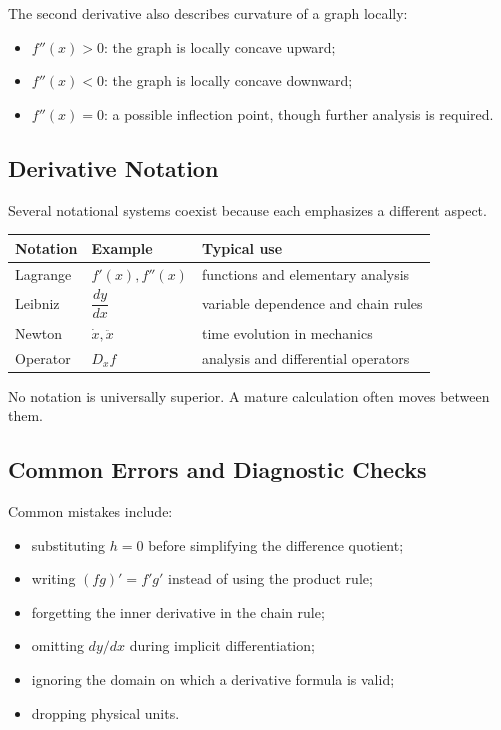The second derivative also describes curvature of a graph locally:

\begin{itemize}
\item $f''(x)>0$: the graph is locally concave upward;
\item $f''(x)<0$: the graph is locally concave downward;
\item $f''(x)=0$: a possible inflection point, though further analysis is required.
\end{itemize}

\subsection{Derivative Notation}

Several notational systems coexist because each emphasizes a different aspect.

\begin{center}
\begin{tabular}{lll}
\toprule
Notation & Example & Typical use\\
\midrule
Lagrange & $f'(x), f''(x)$ & functions and elementary analysis\\
Leibniz & $\dfrac{dy}{dx}$ & variable dependence and chain rules\\
Newton & $\dot x,\ddot x$ & time evolution in mechanics\\
Operator & $D_x f$ & analysis and differential operators\\
\bottomrule
\end{tabular}
\end{center}

No notation is universally superior. A mature calculation often moves between them.

\subsection{Common Errors and Diagnostic Checks}

\begin{bookwarning}
Common mistakes include:

\begin{itemize}
\item substituting $h=0$ before simplifying the difference quotient;
\item writing $(fg)'=f'g'$ instead of using the product rule;
\item forgetting the inner derivative in the chain rule;
\item omitting $dy/dx$ during implicit differentiation;
\item ignoring the domain on which a derivative formula is valid;
\item dropping physical units.
\end{itemize}
\end{bookwarning}


